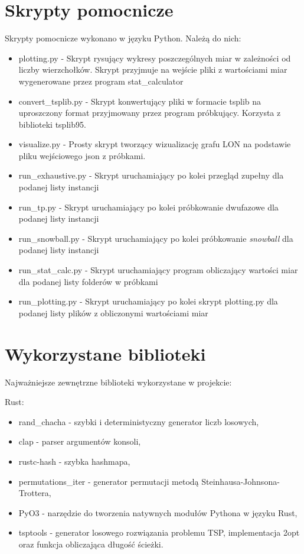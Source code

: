 \section{Skrypty pomocnicze}
Skrypty pomocnicze wykonano w języku Python.
Należą do nich:
\begin{itemize}
    \item plotting.py - Skrypt rysujący wykresy poszczególnych miar w zależności od liczby wierzchołków. Skrypt przyjmuje na wejście pliki z wartościami miar wygenerowane przez program stat\_calculator
    \item convert\_tsplib.py - Skrypt konwertujący pliki w formacie tsplib na uproszczony format przyjmowany przez program próbkujący. Korzysta z biblioteki tsplib95.
    \item visualize.py - Prosty skrypt tworzący wizualizację grafu LON na podstawie pliku wejściowego json z próbkami.
    \item run\_exhaustive.py - Skrypt uruchamiający po kolei przegląd zupełny dla podanej listy instancji
    \item run\_tp.py - Skrypt uruchamiający po kolei próbkowanie dwufazowe dla podanej listy instancji
    \item run\_snowball.py - Skrypt uruchamiający po kolei próbkowanie \textit{snowball} dla podanej listy instancji
    \item run\_stat\_calc.py - Skrypt uruchamiający program obliczający wartości miar dla podanej listy folderów w próbkami
    \item run\_plotting.py - Skrypt uruchamiający po kolei skrypt plotting.py dla podanej listy plików z obliczonymi wartościami miar
\end{itemize}

\section{Wykorzystane biblioteki}
Najważniejsze zewnętrzne biblioteki wykorzystane w projekcie:
\vspace{1em}

Rust:
\begin{itemize}
    \item rand\_chacha - szybki i deterministyczny generator liczb losowych,
    \item clap - parser argumentów konsoli,
    \item rustc-hash - szybka hashmapa,
    \item permutations\_iter - generator permutacji metodą Steinhausa-Johnsona-Trottera,
    \item PyO3 - narzędzie do tworzenia natywnych modułów Pythona w języku Rust,
    \item tsptools - generator losowego rozwiązania problemu TSP, implementacja 2opt oraz funkcja obliczająca długość ścieżki.
\end{itemize}

